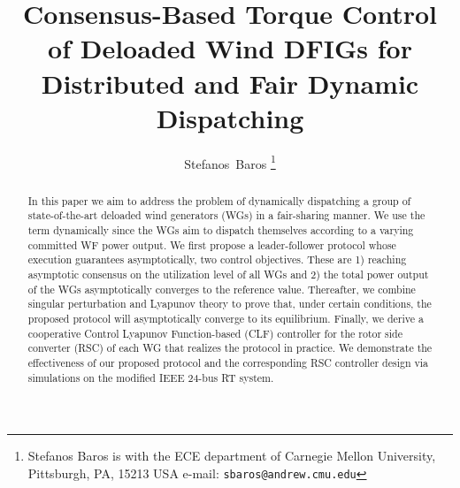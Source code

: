 \documentclass[letterpaper, 10 pt, conference]{ieeeconf}
\title{\LARGE \bf
Consensus-Based Torque Control of Deloaded Wind DFIGs for Distributed and Fair Dynamic Dispatching
}
\author{Stefanos~Baros 
\thanks{Stefanos Baros is with the ECE department
of Carnegie Mellon University, Pittsburgh, PA, 15213 USA e-mail: {\tt sbaros@andrew.cmu.edu}}}
\begin{document}
\maketitle
\thispagestyle{empty}
\pagestyle{empty}



\begin{abstract}
In this paper we aim to address the problem of dynamically dispatching  a group of state-of-the-art deloaded wind generators (WGs) in a fair-sharing manner. We use the term dynamically since the WGs aim to dispatch themselves according to a varying committed WF power output. We first propose a leader-follower  protocol whose execution guarantees asymptotically, two control objectives. These are 1) reaching asymptotic consensus on the utilization level of all WGs and 2) the total power output of the WGs asymptotically converges to the reference value. Thereafter, we combine singular perturbation and Lyapunov theory to prove that, under certain conditions, the proposed protocol will asymptotically converge to its equilibrium. Finally, we derive a cooperative Control Lyapunov Function-based (CLF) controller for the rotor side converter (RSC) of each WG that realizes the protocol in practice. We demonstrate the effectiveness of our proposed protocol and the corresponding RSC controller design via simulations on the modified IEEE 24-bus RT system.


 
 
\end{abstract}







\IEEEpeerreviewmaketitle
\end{document}
